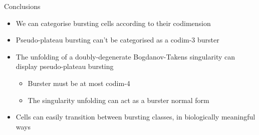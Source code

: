 \documentclass[presentation]{beamer}
\begin{document}
\begin{frame}[label={sec:orgd9c607f}]{Conclusions}
\begin{itemize}[<+->]
\item We can categorise bursting cells according to their codimension
\item Pseudo-plateau bursting can't be categorised as a codim-3 burster
\item The unfolding of a doubly-degenerate Bogdanov-Takens singularity can display pseudo-plateau bursting
\begin{itemize}
\item Burster must be at most codim-4
\item The singularity unfolding can act as a burster normal form
\end{itemize}
\item Cells can easily transition between bursting classes, in biologically meaningful ways
\end{itemize}
\end{frame}
\end{document}
